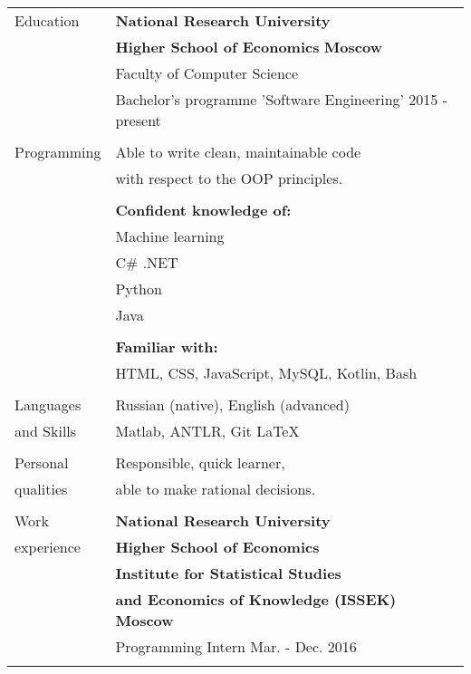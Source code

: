 \documentclass[a4paper,12pt]{article}
\begin{document}
\noindent \begin{tabular}{l l}
  \Large{Education}
     & \textbf{National Research University} \\
     & \textbf{Higher School of Economics} \hfill \hfill \textbf{Moscow} \\
     & Faculty of Computer Science \\
     & Bachelor’s programme 'Software Engineering' \hspace{0.8in} \hfill \hfill 2015 - present \\
     & \\
  \Large{Programming}
     & Able to write clean, maintainable code \\
     & with respect to the OOP principles. \\
     & \\
     & \textbf{Confident knowledge of:} \\
     & Machine learning   \\
     & C\# .NET  \\
     & Python  \\
     & Java  \\
     & \\
     & \textbf{Familiar with:} \\
     & HTML, CSS, JavaScript, MySQL, Kotlin, Bash \\
     & \\
  \Large{Languages} & Russian (native), English (advanced) \\
  \Large{and Skills} & Matlab, ANTLR, Git \LaTeX \\
     & \\
  \Large{Personal} & Responsible, quick learner, \\
  \Large{qualities} & able to make rational decisions. \\
     & \\
  \Large{Work}
     & \textbf{National Research University} \\
  \Large{experience}
     & \textbf{Higher School of Economics} \\
     & \textbf{Institute for Statistical Studies} \\
     & \textbf{and Economics of Knowledge (ISSEK)} \hfill \hfill \textbf{Moscow} \\
     & Programming Intern \hfill \hfill Mar. - Dec. 2016 \\
     & \\
\end{tabular}
\end{document}
